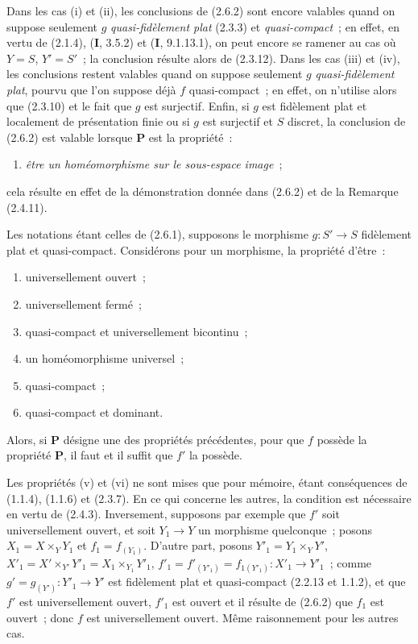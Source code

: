 \begin{remark}[2.6.3]
\label{IV.2.6.3-fr}
Dans les cas (i) et (ii), les conclusions de (2.6.2) sont encore valables
quand on suppose seulement $g$ \emph{quasi-fidèlement plat} (2.3.3) et
\emph{quasi-compact}~; en effet, en vertu de (2.1.4), (\textbf{I}, 3.5.2) et
(\textbf{I}, 9.1.13.1), on peut encore se ramener au cas où $Y=S$, $Y'=S'$~; la
conclusion résulte alors de (2.3.12). Dans les cas (iii) et (iv), les
conclusions restent valables quand on suppose seulement $g$ \emph{quasi-fidèlement
plat}, pourvu que l'on suppose déjà $f$ quasi-compact~; en effet, on n'utilise
alors que (2.3.10) et le fait que $g$ est surjectif. Enfin, si $g$ est
fidèlement plat et localement de présentation finie ou si $g$ est surjectif
et $S$ discret, la conclusion de (2.6.2) est valable lorsque $\boldsymbol{P}$ est la
propriété~:
\begin{enumerate}
\item[(iii \emph{bis})] \emph{être un homéomorphisme sur le sous-espace image}~;
\end{enumerate}
cela résulte en effet de la démonstration donnée dans (2.6.2) et de la
Remarque (2.4.11).
\end{remark}

\begin{corollary}[2.6.4]
\label{IV.2.6.4-fr}
Les notations étant celles de \textup{(2.6.1)}, supposons le morphisme $g:S'\to S$
fidèlement plat et quasi-compact. Considérons pour un morphisme, la propriété
d'être~:
\begin{enumerate}
\item[\textup{(i)}] universellement ouvert~;
\item[\textup{(ii)}] universellement fermé~;
\item[\textup{(iii)}] quasi-compact et universellement bicontinu~;
\item[\textup{(iv)}] un homéomorphisme universel~;
\item[\textup{(v)}] quasi-compact~;
\item[\textup{(vi)}] quasi-compact et dominant.
\end{enumerate}
Alors, si $\boldsymbol{P}$ désigne une des propriétés précédentes, pour que $f$ possède la
propriété $\boldsymbol{P}$, il faut et il suffit que $f'$ la possède.
\end{corollary}

Les propriétés (v) et (vi) ne sont mises que pour mémoire, étant conséquences
de (1.1.4), (1.1.6) et (2.3.7). En ce qui concerne les autres, la condition
est nécessaire en vertu de (2.4.3). Inversement, supposons par exemple que
$f'$ soit universellement ouvert, et soit $Y_1\to Y$ un morphisme
quelconque~; posons $X_1=X\times_Y Y_1$ et $f_1=f_{(Y_1)}$. D'autre part,
posons $Y'_1=Y_1\times_Y Y'$, $X'_1=X'\times_{Y'}Y'_1=X_1\times_{Y_1}Y'_1$, $f'_1=f'_{(Y'_1)}=f_{1(Y'_1)}:X'_1\to Y'_1$~;
comme $g'=g_{(Y')}:Y'_1\to Y'$ est fidèlement plat et quasi-compact
(2.2.13 et 1.1.2), et que $f'$ est universellement ouvert, $f'_1$ est ouvert
et il résulte de (2.6.2) que $f_1$ est ouvert~; donc $f$ est universellement
ouvert. Même raisonnement pour les autres cas.

